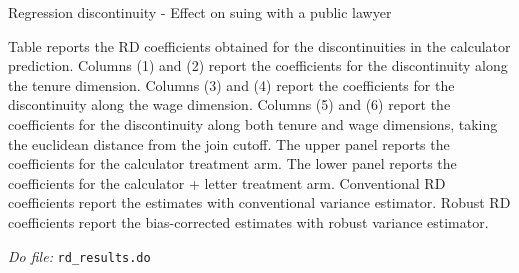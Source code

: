 \documentclass[oneside,11pt]{article}
\begin{document}
\clearpage

\begin{landscape}
\begin{table}[H]
\caption{Regression discontinuity - Effect on suing with a public lawyer}
\label{rd_sued_public}
\begin{center}
\scriptsize{}
\end{center}
\scriptsize{
Table reports the RD coefficients obtained for the discontinuities in the calculator prediction. Columns (1) and (2) report the coefficients for the discontinuity along the tenure dimension. Columns (3) and (4) report the coefficients for the discontinuity along the wage dimension. Columns (5) and (6) report the coefficients for the discontinuity along both tenure and wage dimensions, taking the euclidean distance from the join cutoff. The upper panel reports the coefficients for the calculator treatment arm. The lower panel reports the coefficients for the calculator + letter treatment arm. Conventional RD coefficients report the estimates with conventional variance estimator. Robust RD coefficients report the bias-corrected estimates with robust variance estimator.}

 \scriptsize 
\textit{Do file: } \texttt{rd\_results.do}
\end{table}
\end{landscape}

\clearpage
\end{document}
